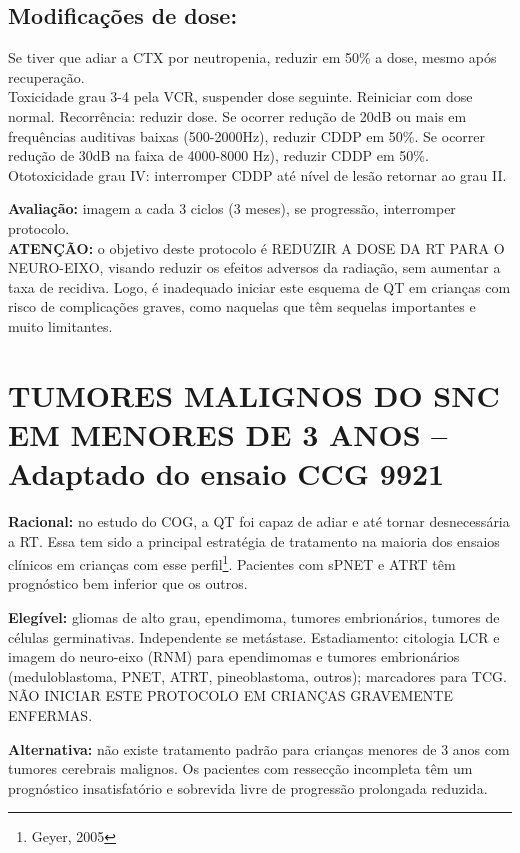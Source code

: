 \documentclass[11pt,a4paper,oldfontcommands]{memoir}
\begin{document}
\subsection{Modificações de dose:}
Se tiver que adiar a CTX por neutropenia, reduzir em 50\% a dose, mesmo após recuperação.\\
Toxicidade grau 3-4 pela VCR, suspender dose seguinte. Reiniciar com dose normal. Recorrência: reduzir dose.
Se ocorrer redução de 20dB ou mais em frequências auditivas baixas (500-2000Hz), reduzir CDDP em 50\%. Se ocorrer redução de 30dB na faixa de 4000-8000 Hz), reduzir CDDP em 50\%. Ototoxicidade grau IV: interromper CDDP até nível de lesão retornar ao grau II.

\textbf{Avaliação:} imagem a cada 3 ciclos (3 meses), se progressão, interromper protocolo.\\

\textbf{ATENÇÃO:} o objetivo deste protocolo é REDUZIR A DOSE DA RT PARA O NEURO-EIXO, visando reduzir os efeitos adversos da radiação, sem aumentar a taxa de recidiva. Logo, é inadequado iniciar este esquema de QT em crianças com risco de complicações graves, como naquelas que têm sequelas importantes e muito limitantes.\\
\cleardoublepage
\section{TUMORES MALIGNOS DO SNC EM MENORES DE 3 ANOS -- Adaptado do ensaio CCG 9921}
{\let\thefootnote\relax{}}
\small
\textbf{Racional:} no estudo do COG, a QT foi capaz de adiar e até tornar desnecessária a RT. Essa tem sido a principal estratégia de tratamento na maioria dos ensaios clínicos em crianças com esse perfil\footnote{Geyer, 2005}. Pacientes com sPNET e ATRT têm prognóstico bem inferior que os outros.

\textbf{Elegível:} gliomas de alto grau, ependimoma, tumores embrionários, tumores de células germinativas. Independente se metástase. Estadiamento: citologia LCR e imagem do neuro-eixo (RNM) para ependimomas e tumores embrionários (meduloblastoma, PNET, ATRT, pineoblastoma, outros); marcadores para TCG. NÃO INICIAR ESTE PROTOCOLO EM CRIANÇAS GRAVEMENTE ENFERMAS.

\textbf{Alternativa:} não existe tratamento padrão para crianças menores de 3 anos com tumores cerebrais malignos. Os pacientes com ressecção incompleta têm um prognóstico insatisfatório e sobrevida livre de progressão prolongada reduzida.
\end{document}
